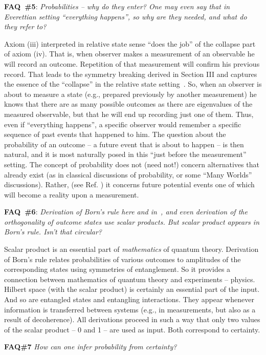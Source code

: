 \documentclass[aps,amsmath,amssymb,amsfonts,12pt]{revtex4-1}
\newcommand{\+}         {\dagger}
\begin{document}
{{{{\bf FAQ~\#5}: {\it Probabilities -- why do they enter? One may even say that in Everettian setting ``everything happens'', so why are they needed, and what do they refer to?}

Axiom (iii) interpreted in relative state sense ``does the job'' of the collapse part of axiom (iv). That is, when observer makes a measurement of an observable he will record an outcome. Repetition of that measurement will confirm his previous record. That leads to the symmetry breaking derived in Section III and captures the essence of the ``collapse'' in the relative state setting~\cite{75,79}. So, when an observer is about to measure a state (e.g., prepared previously by another measurement) he knows that there are as many possible outcomes as there are eigenvalues of the measured observable, but that he will end up recording just one of them. Thus, even if ``everything happens'', a specific observer would remember a specific sequence of past events that happened to him. The question about the probability of an outcome -- a future event that is about to happen -- is then natural, and it is most naturally posed in this ``just before the measurement'' setting. The concept of probability does not (need not!) concern alternatives that already exist (as in classical discussions of probability, or some ``Many Worlds'' discussions). Rather, (see Ref. \cite{78,Sebens}) it concerns future potential events one of which will become a reality upon a measurement.

{\bf FAQ~\#6}: {\it Derivation of Born's rule here and in~\cite{75,76,78,Z07a}, and even derivation of the orthogonality of outcome states use scalar products. But scalar product appears in Born's rule. Isn't that circular?}

Scalar product is an essential part of {\it mathematics} of quantum theory. Derivation of Born's rule relates probabilities of various outcomes to amplitudes of the corresponding states using symmetries of entanglement. So it provides a connection between mathematics of quantum theory and experiments -- physics. Hilbert space (with the scalar product) is certainly an essential part of the input. And so are entangled states and entangling interactions. They appear whenever information is transferred between systems (e.g., in measurements, but also as a result of decoherence). All derivations proceed in such a way that only two values of the scalar product -- 0 and 1 -- are used as input. Both correspond to certainty. 

{\bf FAQ\#7} {\it How can one infer probability from certainty?}

}}}
\end{document}
